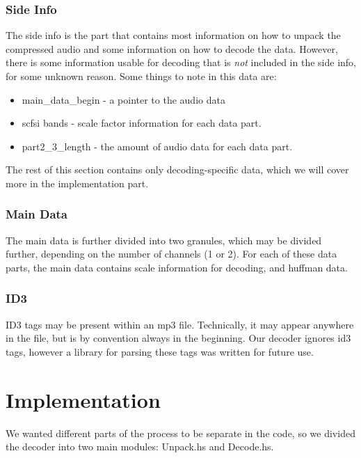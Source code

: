 \documentclass[a4paper,12pt]{article}
\begin{document}
       \subsubsection{Side Info}
            The side info is the part that contains most information on how to
            unpack the compressed audio and some information on how to decode
            the data. However, there is some information usable for decoding
            that is \textit{not} included in the side info, for some unknown
            reason. Some things to note in this data are: 
            \begin{itemize}
                \item main\_data\_begin - a pointer to the audio data
                \item scfsi bands - scale factor information for each data part.
                \item part2\_3\_length - the amount of audio data for each 
                      data part.
            \end{itemize}
            The rest of this section contains only decoding-specific data, which
            we will cover more in the implementation part.
       
       \subsubsection{Main Data}
            The main data is further divided into two granules, which may be
            divided further, depending on the number of channels (1 or 2). For
            each of these data parts, the main data contains scale information
            for decoding, and huffman data.
        
        \subsubsection{ID3}
            ID3 tags may be present within an mp3 file. Technically, it may
            appear anywhere in the file, but is by convention always in the
            beginning. Our decoder ignores id3 tags, however a library for
            parsing these tags was written for future use.

\section{Implementation}
    We wanted different parts of the process to be separate in the code, so we
    divided the decoder into two main modules: Unpack.hs and Decode.hs. 
\end{document}
